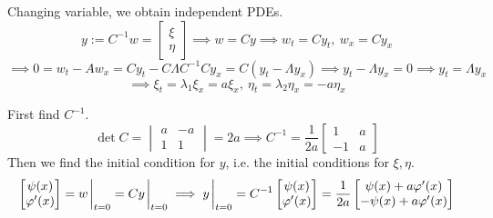 \documentclass{article}
\newcommand{\m}[2][b]{\begin{#1matrix}#2\end{#1matrix}}
\newcommand{\vp}{\varphi}
\newcommand{\inv}{^{-1}}
\newcommand{\imp}{\implies}
\begin{document}
\begin{enumerate}[label=(\alph*)]
Changing variable, we obtain independent PDEs.
$$y := C\inv w = \m{\xi \\ \eta}
\imp w = Cy
\imp w_t = Cy_t,
~w_x = Cy_x$$
$$\imp 0 = w_t - Aw_x
= Cy_t - C\Lambda C\inv Cy_x
= C(y_t-\Lambda y_x)
\imp y_t - \Lambda y_x = 0
\imp y_t = \Lambda y_x$$
$$\imp \xi_t = \lambda_1\xi_x = a\xi_x,
~\eta_t = \lambda_2\eta_x = -a\eta_x$$

First find $C\inv$.
$$\det C = \m[v]{a & -a \\ 1 & 1}
= 2a
\imp C\inv = \frac{1}{2a}\m{1 & a \\ -1 & a}$$
Then we find the initial condition for $y$, i.e. the initial conditions for $\xi,\eta$.
$$\m{\psi(x) \\ \vp'(x)} = w\eval_{t=0} = Cy\eval_{t=0}
\imp y\eval_{t=0} = C\inv\m{\psi(x) \\ \vp'(x)}
= \frac{1}{2a}\m{\psi(x)+a\vp'(x) \\ -\psi(x)+a\vp'(x)}$$
	
\end{enumerate}


	
\end{document}
